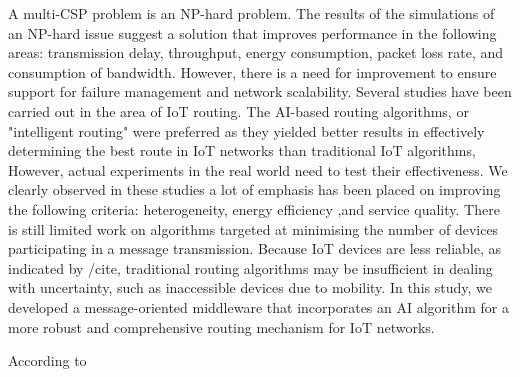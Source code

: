  A multi-CSP problem is an NP-hard problem. The results of the simulations of an NP-hard issue suggest a solution that improves performance in the following areas: 
transmission delay, throughput, energy consumption, packet loss rate, and consumption of bandwidth. However, 
there is a need for improvement to ensure support for failure management and network scalability. 
Several studies have been carried out in the area of IoT routing. The AI-based routing algorithms, or "intelligent routing"
were preferred as they yielded better results in effectively determining the best route in IoT networks than traditional
IoT algorithms, However, actual experiments in the real world need to test their effectiveness. We clearly observed in 
these studies a lot of emphasis has been placed on improving the following criteria: heterogeneity, energy efficiency
,and service quality. There is still limited work on algorithms targeted at minimising the number of devices 
participating in a message transmission. Because IoT devices are less reliable, as indicated by /cite, traditional routing
algorithms may be insufficient in dealing with uncertainty, such as inaccessible devices due to mobility. 
In this study, we developed a message-oriented middleware that incorporates an AI algorithm for a more robust and 
comprehensive routing mechanism for IoT networks.

According to \cite{plageras-psannis:2017}
